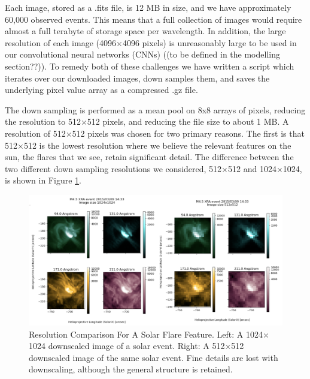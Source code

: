 \documentclass[12pt, letterpaper]{article}
\begin{document}
Each image, stored as a .fits file, is 12 MB in size, and we have approximately 60,000 observed events. This means that a full collection of images would require almost a full terabyte of storage space per wavelength. In addition, the large resolution of each image (4096$\times$4096 pixels) is unreasonably large to be used in our convolutional neural networks (CNNs) ((to be defined in the modelling section??)). To remedy both of these challenges we have written a script which iterates over our downloaded images, down samples them, and saves the underlying pixel value array as a compressed .gz file. 

The down sampling is performed as a mean pool on 8x8 arrays of pixels, reducing the resolution to 512$\times$512 pixels, and reducing the file size to about 1 MB. A resolution of 512$\times$512 pixels was chosen for two primary reasons. The first is that 512$\times$512 is the lowest resolution where we believe the relevant features on the sun, the flares that we see, retain significant detail. The difference between the two different down sampling resolutions we considered, 512$\times$512 and 1024$\times$1024, is shown in Figure \ref{resolution_1024}.


\begin{figure}[h]
	\centering
	\includegraphics[width=\textwidth]{figures/resolution_demo.png}
	\caption{Resolution Comparison For A Solar Flare Feature. Left: A 1024$\times$1024 downscaled image of a solar event. Right: A 512$\times$512 downscaled image of the same solar event. Fine details are lost with downscaling, although the general structure is retained.}
	\label{resolution_1024}
\end{figure}
\end{document}
